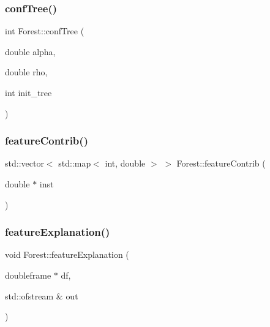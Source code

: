 \mbox{\label{classForest_aa2b99dda19e39783a6da9de8fa318ceb}} 
\subsubsection{\texorpdfstring{conf\+Tree()}{confTree()}}
{\footnotesize\ttfamily int Forest\+::conf\+Tree (\begin{DoxyParamCaption}\item[{double}]{alpha,  }\item[{double}]{rho,  }\item[{int}]{init\+\_\+tree }\end{DoxyParamCaption})\hspace{0.3cm}{\ttfamily [virtual]}}

\mbox{\label{classForest_a1c17fba4c766d0dbd41df7a050b1fa81}} 
\subsubsection{\texorpdfstring{feature\+Contrib()}{featureContrib()}}
{\footnotesize\ttfamily std\+::vector$<$ std\+::map$<$ int, double $>$ $>$ Forest\+::feature\+Contrib (\begin{DoxyParamCaption}\item[{double $\ast$}]{inst }\end{DoxyParamCaption})\hspace{0.3cm}{\ttfamily [virtual]}}

\mbox{\label{classForest_abcae06f2a9b350eac3f8617ac7bc9e1a}} 
\subsubsection{\texorpdfstring{feature\+Explanation()}{featureExplanation()}}
{\footnotesize\ttfamily void Forest\+::feature\+Explanation (\begin{DoxyParamCaption}\item[{doubleframe $\ast$}]{df,  }\item[{std\+::ofstream \&}]{out }\end{DoxyParamCaption})}


